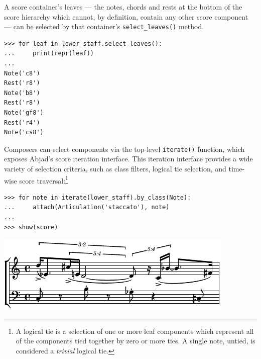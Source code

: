 \documentclass{article}
\begin{document}
A score container's leaves --- the notes, chords and rests at the bottom of the
score hierarchy which cannot, by definition, contain any other score component
--- can be selected by that container's \texttt{select\_leaves()} method.

\begin{lstlisting}
>>> for leaf in lower_staff.select_leaves():
...     print(repr(leaf))
...
Note('c8')
Rest('r8')
Note('b8')
Rest('r8')
Note('gf8')
Rest('r4')
Note('cs8')
\end{lstlisting}

Composers can select components via the top-level \texttt{iterate()} function,
which exposes Abjad's score iteration interface. This iteration interface
provides a wide variety of selection criteria, such as class filters, logical
tie selection, and time-wise score traversal:\footnote{A logical tie is a
selection of one or more leaf components which represent all of the components
tied together by zero or more ties. A single note, untied, is considered a
\emph{trivial} logical tie.}

\begin{lstlisting}
>>> for note in iterate(lower_staff).by_class(Note):
...     attach(Articulation('staccato'), note)
...
>>> show(score)
\end{lstlisting}
\includegraphics{assets/lilypond-1aa26e8361e9c7841287eeed734f1cb9.pdf}

\end{document}

